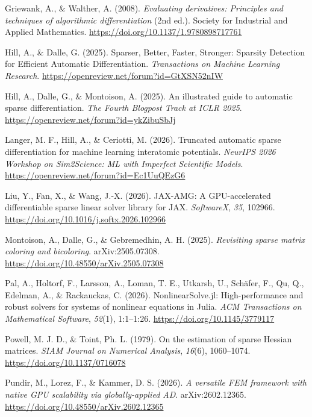 \documentclass[
]{article}
\newlength{\cslhangindent}
\newenvironment{CSLReferences}[2] %
 {\begin{list}{}{%
  \setlength{\itemindent}{0pt}
  \setlength{\leftmargin}{0pt}
  \setlength{\parsep}{0pt}
  \ifodd #1
   \setlength{\leftmargin}{\cslhangindent}
   \setlength{\itemindent}{-1\cslhangindent}
  \fi
  \setlength{\itemsep}{#2\baselineskip}}}
 {\end{list}}
\begin{document}
\begin{CSLReferences}{1}{0}
Griewank, A., \& Walther, A. (2008). \emph{Evaluating derivatives:
Principles and techniques of algorithmic differentiation} (2nd ed.).
{Society for Industrial and Applied Mathematics}.
\url{https://doi.org/10.1137/1.9780898717761}

Hill, A., \& Dalle, G. (2025). Sparser, {Better}, {Faster}, {Stronger}:
{Sparsity} {Detection} for {Efficient} {Automatic} {Differentiation}.
\emph{Transactions on Machine Learning Research}.
\url{https://openreview.net/forum?id=GtXSN52nIW}

Hill, A., Dalle, G., \& Montoison, A. (2025). An illustrated guide to
automatic sparse differentiation. \emph{The Fourth Blogpost Track at
ICLR 2025}. \url{https://openreview.net/forum?id=ykZibuSbJj}

Langer, M. F., Hill, A., \& Ceriotti, M. (2026). Truncated automatic
sparse differentiation for machine learning interatomic potentials.
\emph{NeurIPS 2026 Workshop on Sim2Science: ML with Imperfect Scientific
Models}. \url{https://openreview.net/forum?id=Ec1UuQEzG6}

Liu, Y., Fan, X., \& Wang, J.-X. (2026). {JAX}-{AMG}: A
{GPU}-accelerated differentiable sparse linear solver library for {JAX}.
\emph{SoftwareX}, \emph{35}, 102966.
\url{https://doi.org/10.1016/j.softx.2026.102966}

Montoison, A., Dalle, G., \& Gebremedhin, A. H. (2025). \emph{Revisiting
sparse matrix coloring and bicoloring}. arXiv:2505.07308.
\url{https://doi.org/10.48550/arXiv.2505.07308}

Pal, A., Holtorf, F., Larsson, A., Loman, T. E., Utkarsh, U., Schäfer,
F., Qu, Q., Edelman, A., \& Rackauckas, C. (2026). {NonlinearSolve.jl}:
High-performance and robust solvers for systems of nonlinear equations
in {Julia}. \emph{ACM Transactions on Mathematical Software},
\emph{52}(1), 1:1--1:26. \url{https://doi.org/10.1145/3779117}

Powell, M. J. D., \& Toint, Ph. L. (1979). On the estimation of sparse
{Hessian} matrices. \emph{SIAM Journal on Numerical Analysis},
\emph{16}(6), 1060--1074. \url{https://doi.org/10.1137/0716078}

Pundir, M., Lorez, F., \& Kammer, D. S. (2026). \emph{A versatile {FEM}
framework with native {GPU} scalability via globally-applied {AD}}.
arXiv:2602.12365. \url{https://doi.org/10.48550/arXiv.2602.12365}


\end{CSLReferences}
\end{document}
